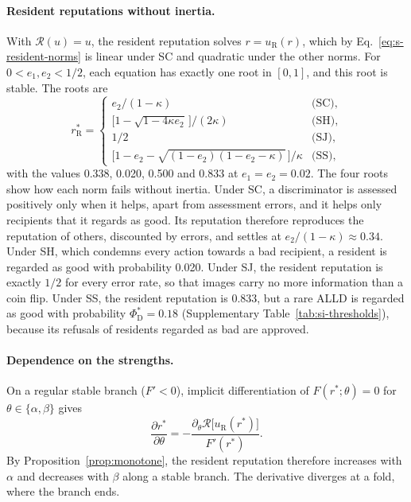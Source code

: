 \documentclass[10pt]{wlscirep}
\newcommand{\Rmap}{\mathscr{R}}            %
\newcommand{\rR}{r_{\mathrm{R}}^{*}}
\newcommand{\PhiDs}{\Phi^{*}_{\mathrm{D}}}
\theoremstyle{plain}
\theoremstyle{remark}
\begin{document}
\paragraph{Resident reputations without inertia.} With $\Rmap(u)=u$, the resident reputation solves $r=u_{\mathrm R}(r)$, which by Eq.~\eqref{eq:s-resident-norms} is linear under SC and quadratic under the other norms. For $0<e_1,e_2<1/2$, each equation has exactly one root in $[0,1]$, and this root is stable. The roots are
\begin{equation}
\rR=\begin{cases}
e_2/(1-\kappa) & \text{(SC)},\\
\bigl[1-\sqrt{1-4\kappa e_2}\,\bigr]/(2\kappa) & \text{(SH)},\\
1/2 & \text{(SJ)},\\
\bigl[1-e_2-\sqrt{(1-e_2)(1-e_2-\kappa)}\,\bigr]/\kappa & \text{(SS)},
\end{cases}
\label{eq:s-instantaneous}
\end{equation}
with the values 0.338, 0.020, 0.500 and 0.833 at $e_1=e_2=0.02$. The four roots show how each norm fails without inertia. Under SC, a discriminator is assessed positively only when it helps, apart from assessment errors, and it helps only recipients that it regards as good. Its reputation therefore reproduces the reputation of others, discounted by errors, and settles at $e_2/(1-\kappa)\approx0.34$. Under SH, which condemns every action towards a bad recipient, a resident is regarded as good with probability 0.020. Under SJ, the resident reputation is exactly $1/2$ for every error rate, so that images carry no more information than a coin flip. Under SS, the resident reputation is 0.833, but a rare ALLD is regarded as good with probability $\PhiDs=0.18$ (Supplementary Table~\ref{tab:si-thresholds}), because its refusals of residents regarded as bad are approved.

\paragraph{Dependence on the strengths.} On a regular stable branch ($F'<0$), implicit differentiation of $F(r^*;\theta)=0$ for $\theta\in\{\alpha,\beta\}$ gives
\begin{equation}
\frac{\partial r^*}{\partial\theta}=-\frac{\partial_\theta\Rmap\bigl[u_{\mathrm R}(r^*)\bigr]}{F'(r^*)}.
\label{eq:s-sensitivity}
\end{equation}
By Proposition~\ref{prop:monotone}, the resident reputation therefore increases with $\alpha$ and decreases with $\beta$ along a stable branch. The derivative diverges at a fold, where the branch ends.
\end{document}
